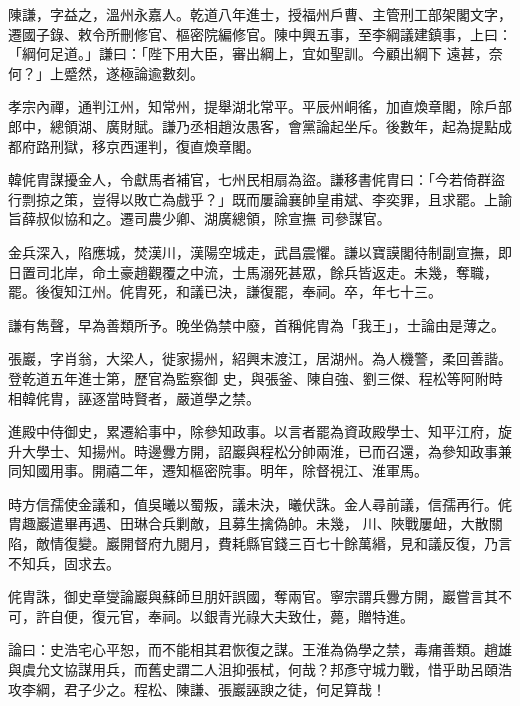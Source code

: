\begin{pinyinscope}
 陳謙，字益之，溫州永嘉人。乾道八年進士，授福州戶曹、主管刑工部架閣文字，遷國子錄、敕令所刪修官、樞密院編修官。陳中興五事，至李綱議建鎮事，上曰：「綱何足道。」謙曰：「陛下用大臣，審出綱上，宜如聖訓。今顧出綱下
 遠甚，奈何？」上蹙然，遂極論逾數刻。



 孝宗內禪，通判江州，知常州，提舉湖北常平。平辰州峒徭，加直煥章閣，除戶部郎中，總領湖、廣財賦。謙乃丞相趙汝愚客，會黨論起坐斥。後數年，起為提點成都府路刑獄，移京西運判，復直煥章閣。



 韓侂胄謀擾金人，令獻馬者補官，七州民相扇為盜。謙移書侂胄曰：「今若倚群盜行剽掠之策，豈得以敗亡為戲乎？」既而屢論襄帥皇甫斌、李奕罪，且求罷。上諭旨薛叔似協和之。遷司農少卿、湖廣總領，除宣撫
 司參謀官。



 金兵深入，陷應城，焚漢川，漢陽空城走，武昌震懼。謙以寶謨閣待制副宣撫，即日置司北岸，命土豪趙觀覆之中流，士馬溺死甚眾，餘兵皆返走。未幾，奪職，罷。後復知江州。侂胄死，和議已決，謙復罷，奉祠。卒，年七十三。



 謙有雋聲，早為善類所予。晚坐偽禁中廢，首稱侂胄為「我王」，士論由是薄之。



 張巖，字肖翁，大梁人，徙家揚州，紹興末渡江，居湖州。為人機警，柔回善諧。登乾道五年進士第，歷官為監察御
 史，與張釜、陳自強、劉三傑、程松等阿附時相韓侂胄，誣逐當時賢者，嚴道學之禁。



 進殿中侍御史，累遷給事中，除參知政事。以言者罷為資政殿學士、知平江府，旋升大學士、知揚州。時邊釁方開，詔巖與程松分帥兩淮，已而召還，為參知政事兼同知國用事。開禧二年，遷知樞密院事。明年，除督視江、淮軍馬。



 時方信孺使金議和，值吳曦以蜀叛，議未決，曦伏誅。金人尋前議，信孺再行。侂胄趣巖遣畢再遇、田琳合兵剿敵，且募生擒偽帥。未幾，
 川、陜戰屢衄，大散關陷，敵情復變。巖開督府九閱月，費耗縣官錢三百七十餘萬緡，見和議反復，乃言不知兵，固求去。



 侂胄誅，御史章燮論巖與蘇師旦朋奸誤國，奪兩官。寧宗謂兵釁方開，巖嘗言其不可，許自便，復元官，奉祠。以銀青光祿大夫致仕，薨，贈特進。



 論曰：史浩宅心平恕，而不能相其君恢復之謀。王淮為偽學之禁，毒痡善類。趙雄與虞允文協謀用兵，而舊史謂二人沮抑張栻，何哉？邦彥守城力戰，惜乎助呂頤浩
 攻李綱，君子少之。程松、陳謙、張巖誣諛之徒，何足算哉！



\end{pinyinscope}